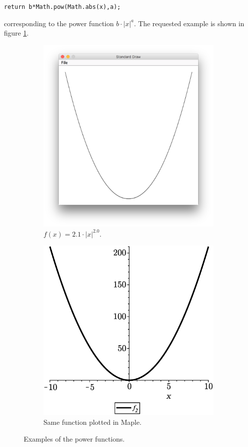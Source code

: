 \begin{lstlisting}
return b*Math.pow(Math.abs(x),a);
\end{lstlisting}

corresponding to the power function $b \cdot |x|^{a}$. The requested example is shown in figure \ref{fig:f2}. 


\begin{figure}[H]
    \begin{subfigure}{0.5\textwidth}
    \centering
    \includegraphics[width=0.7\linewidth]{GraphicalFunctionPlotter/fig/f2.png} 
    \caption{$f(x) = 2.1\cdot |x|^{2.0}$.}
    \label{fig:f2}
    \end{subfigure}
    \begin{subfigure}{0.5\textwidth}
    \centering
    \includegraphics[width=0.7\linewidth]{GraphicalFunctionPlotter/fig/f2Check.eps}
    \caption{Same function plotted in Maple.}
    \label{fig:f2Check}
    \end{subfigure}
    \caption{Examples of the power functions.}
\end{figure}

